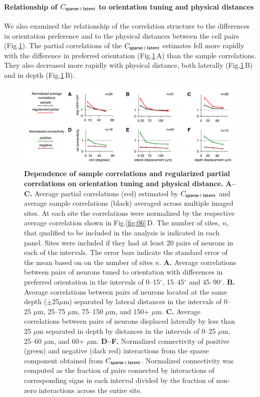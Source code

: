 \documentclass[10pt]{article}
\newcommand{\figref}[2]{Fig.\;\ref{fig:#1}\,#2}
\begin{document}
\paragraph{Relationship of $C_{\sf sparse+latent}$ to orientation tuning and physical distances}

We also examined the relationship of the correlation structure to the differences in orientation preference and to the physical distances between the cell pairs (Fig.\;\ref{fig:07}).  The partial correlations of the $C_{\sf sparse+latent}$ estimates fell more rapidly with the difference in preferred orientation (\figref{07}{A}) than the sample correlations. They also decreased more rapidly with physical distance, both laterally  (\figref{07}{B}) and in depth (\figref{07}{B}). 

\begin{figure}[!ht]
    \begin{center}
        \includegraphics{./figures/Figure07.pdf}
    \end{center}
    \caption{{\bf Dependence of sample correlations and regularized partial correlations on orientation tuning and physical distance.}
    {\bf A--C.} Average partial correlations (red) estimated by $C_{\sf sparse+latent}$ and average sample correlations (black) averaged across multiple imaged sites. At each site the correlations were normalized by the respective average correlation shown in \figref{06}{D}.  The number of sites, $n$, that qualified to be included in the analysis is indicated in each panel. Sites were included if they had at least 20 pairs of neurons in each of the intervals. The error bars indicate the standard error of the mean based on on the number of sites $n$.
    {\bf A.} Average correlations between pairs of neurons tuned to orientation with differences in preferred orientation in the intervals of 0--15$^\circ$, 15--45$^\circ$ and 45--90$^\circ$. 
    {\bf B.} Average correlations between pairs of neurons located at the same depth ($\pm$25$\mu$m) separated by lateral distances in the intervals of 0--25 $\mu$m, 25--75 $\mu$m, 75--150 $\mu$m, and 150+ $\mu$m.
    {\bf C.} Average correlations between pairs of neurons displaced laterally by less than 25 $\mu$m separated in depth by distances in the intervals of 0--25 $\mu$m, 25--60 $\mu$m, and 60+ $\mu$m.
    {\bf D--F.} Normalized connectivity of positive (green) and negative (dark red) interactions from the sparse component obtained from $C_{\sf sparse+latent}$. Normalized connectivity was computed as the fraction of pairs connected by interactions of corresponding signs in each interval divided by the fraction of non-zero interactions across the entire site. }
\label{fig:07}
\end{figure}
\end{document}
